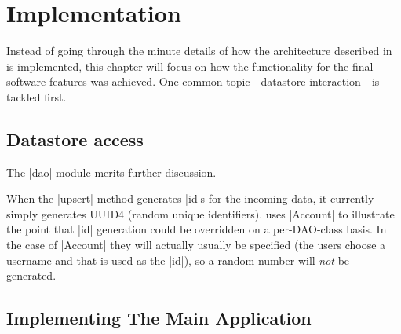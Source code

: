 \chapter{Implementation}




Instead of going through the minute details of how the architecture described in  is implemented, this chapter will focus on how the functionality for the final software features was achieved. One common topic - datastore interaction - is tackled first.


\section{Datastore access}
The |dao| module merits further discussion.

When the |upsert| method generates |id|s for the incoming data, it currently simply generates UUID4 (random unique identifiers).  uses |Account| to illustrate the point that |id| generation could be overridden on a per-DAO-class basis. In the case of |Account| they will actually usually be specified (the users choose a username and that is used as the |id|), so a random number will \emph{not} be generated.


\section{Implementing The Main Application}

